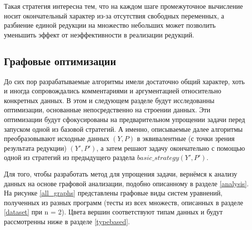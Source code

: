 \documentclass[../diploma.tex]{subfiles}
\begin{document}
Такая стратегия интересна тем, что на каждом шаге промежуточное вычисление носит окончательный характер из-за отсутствия свободных переменных, а разбиение единой редукции на множество небольших может позволить уменьшить эффект от неэффективности в реализации редукций.

\subsection{Графовые оптимизации}\label{graphbased}

До сих пор разрабатываемые алгоритмы имели достаточно общий характер, хоть и иногда сопровождались комментариями и аргументацией относительно конкретных данных. В этом и следующем разделе будут исследованны оптимизации, основанные непосредственно на строении данных. Эти оптимизации будут сфокусированы на предварительном упрощении задачи перед запуском одной из базовой стратегий. А именно, описываемые далее алгоритмы преобразовывают исходные данных $(Y, P)$ в эквивалентные (с точки зрения результата редукции) $(Y', P')$, а затем решают задачу окончательно с помощью одной из стратегий из предыдущего раздела $basic\_strategy(Y', P')$.

Для того, чтобы разработать метод для упрощения задачи, вернёмся к анализу данных на основе графовой анализации, подобно описанному в разделе \ref{analysis}. На рисунке \ref{all_graphs} представлены графовые виды систем уравнений, полученных из разных программ (тесты из всех множеств, описанных в разделе \ref{dataset} при n = 2). Цвета вершин соответствуют типам данных и будут рассмотренны ниже в разделе \ref{typebased}.

\captionsetup{justification   = raggedright,
              singlelinecheck = false}
\end{document}
